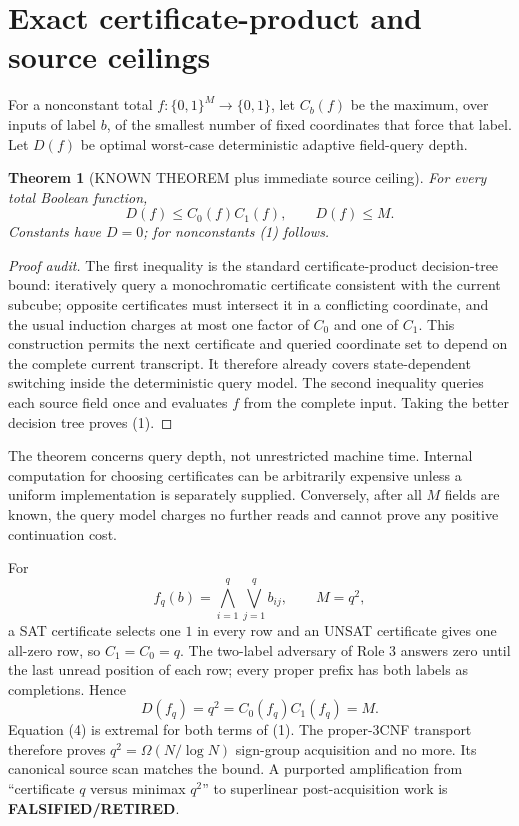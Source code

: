 \documentclass[11pt]{article}
\newtheorem{theorem}{Theorem}
\begin{document}
\section{Exact certificate-product and source ceilings}
For a nonconstant total $f:\{0,1\}^M\to\{0,1\}$, let $C_b(f)$ be the
maximum, over inputs of label $b$, of the smallest number of fixed coordinates
that force that label.  Let $D(f)$ be optimal worst-case deterministic adaptive
field-query depth.

\begin{theorem}[KNOWN THEOREM plus immediate source ceiling]\label{th:product}
For every total Boolean function,
\[
D(f)\le C_0(f)C_1(f),\qquad D(f)\le M.
\tag{2}
\]
Constants have $D=0$; for nonconstants (1) follows.
\end{theorem}
\begin{proof}[Proof audit]
The first inequality is the standard certificate-product decision-tree bound:
iteratively query a monochromatic certificate consistent with the current
subcube; opposite certificates must intersect it in a conflicting coordinate,
and the usual induction charges at most one factor of $C_0$ and one of $C_1$.
This construction permits the next certificate and queried coordinate set to
depend on the complete current transcript.  It therefore already covers
state-dependent switching inside the deterministic query model.  The second
inequality queries each source field once and evaluates $f$ from the complete
input.  Taking the better decision tree proves (1).
\end{proof}
The theorem concerns query depth, not unrestricted machine time.  Internal
computation for choosing certificates can be arbitrarily expensive unless a
uniform implementation is separately supplied.  Conversely, after all $M$
fields are known, the query model charges no further reads and cannot prove
any positive continuation cost.

For
\[
f_q(b)=\bigwedge_{i=1}^q\bigvee_{j=1}^q b_{ij},\qquad M=q^2,
\tag{3}
\]
a SAT certificate selects one $1$ in every row and an UNSAT certificate gives
one all-zero row, so $C_1=C_0=q$.  The two-label adversary of Role 3 answers
zero until the last unread position of each row; every proper prefix has both
labels as completions.  Hence
\[
D(f_q)=q^2=C_0(f_q)C_1(f_q)=M.
\tag{4}
\]
Equation (4) is extremal for both terms of (1).  The proper-3CNF transport
therefore proves $q^2=\Omega(N/\log N)$ sign-group acquisition and no more.
Its canonical source scan matches the bound.  A purported amplification from
``certificate $q$ versus minimax $q^2$'' to superlinear post-acquisition work
is \textbf{FALSIFIED/RETIRED}.
\end{document}
